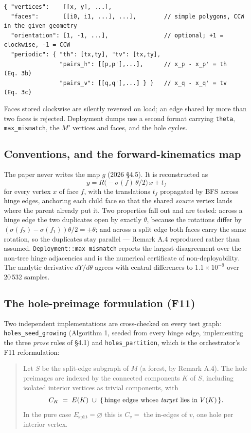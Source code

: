 \documentclass[10pt,a4paper]{article}
\newcommand{\fn}[1]{\nolinkurl{#1}}
\begin{document}
\begin{verbatim}
{ "vertices":    [[x, y], ...],
  "faces":       [[i0, i1, ...], ...],        // simple polygons, CCW in the given geometry
  "orientation": [1, -1, ...],                // optional; +1 = clockwise, -1 = CCW
  "periodic": { "th": [tx,ty], "tv": [tx,ty],
                "pairs_h": [[p,p'],...],      // x_p - x_p' = th   (Eq. 3b)
                "pairs_v": [[q,q'],...] } }   // x_q - x_q' = tv   (Eq. 3c)
\end{verbatim}
Faces stored clockwise are silently reversed on load; an edge shared by more than two faces is
rejected. Deployment dumps use a second format carrying \texttt{theta},
\texttt{max\_mismatch}, the $M'$ vertices and faces, and the hole cycles.

\subsection{Conventions, and the forward-kinematics map}

The paper never writes the map $g$ (2026 \S4.5). It is reconstructed as
\[
y = R\big(-\sigma(f)\,\theta/2\big)\,x + t_f
\]
for every vertex $x$ of face $f$, with the translations $t_f$ propagated by BFS across hinge
edges, anchoring each child face so that the shared \emph{source} vertex lands where the parent
already put it. Two properties fall out and are tested: across a hinge edge the two duplicates
open by exactly $\theta$, because the rotations differ by
$(\sigma(f_2)-\sigma(f_1))\theta/2 = \pm\theta$; and across a split edge both faces carry the
same rotation, so the duplicates stay parallel --- Remark A.4 reproduced rather than assumed.
\texttt{Deployment::max\_mismatch} reports the largest disagreement over the non-tree hinge
adjacencies and is the numerical certificate of non-deployability. The analytic derivative
$dY/d\theta$ agrees with central differences to $1.1\times 10^{-9}$ over 20\,532 samples.

\subsection{The hole-preimage formulation (F11)}

Two independent implementations are cross-checked on every test graph:
\fn{holes_seed_growing} (Algorithm 1, seeded from every hinge edge, implementing the three
\emph{prose} rules of \S4.1) and \fn{holes_partition}, which is the orchestrator's F11
reformulation:

\begin{quote}
Let $S$ be the split-edge subgraph of $M$ (a forest, by Remark A.4). The hole preimages are
indexed by the connected components $K$ of $S$, including isolated interior vertices as trivial
components, with
\[
C_K \;=\; E(K)\;\cup\;\{\,\text{hinge edges whose \emph{target} lies in } V(K)\,\}.
\]
In the pure case $E_{\mathrm{split}}=\varnothing$ this is $C_v = $ the in-edges of $v$, one hole
per interior vertex.
\end{quote}
\end{document}
